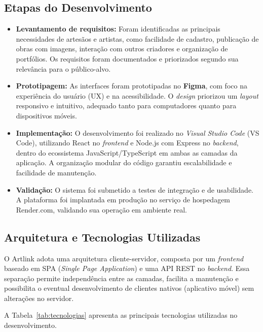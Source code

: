 \documentclass[a4paper, 12pt, oneside]{article}
\begin{document}
\subsection{Etapas do Desenvolvimento}

\begin{itemize}
    \item \textbf{Levantamento de requisitos:} Foram identificadas as principais necessidades de artesãos e artistas, como facilidade de cadastro, publicação de obras com imagens, interação com outros criadores e organização de portfólios. Os requisitos foram documentados e priorizados segundo sua relevância para o público-alvo.

    \item \textbf{Prototipagem:} As interfaces foram prototipadas no \textbf{Figma}, com foco na experiência do usuário (UX) e na acessibilidade. O \textit{design} priorizou um \textit{layout} responsivo e intuitivo, adequado tanto para computadores quanto para dispositivos móveis.

    \item \textbf{Implementação:} O desenvolvimento foi realizado no \textit{Visual Studio Code} (VS Code), utilizando React no \textit{frontend} e Node.js com Express no \textit{backend}, dentro do ecossistema JavaScript/TypeScript em ambas as camadas da aplicação. A organização modular do código garantiu escalabilidade e facilidade de manutenção.

    \item \textbf{Validação:} O sistema foi submetido a testes de integração e de usabilidade. A plataforma foi implantada em produção no serviço de hospedagem Render.com, validando sua operação em ambiente real.
\end{itemize}

\subsection{Arquitetura e Tecnologias Utilizadas}

O Artlink adota uma arquitetura cliente-servidor, composta por um \textit{frontend} baseado em SPA (\textit{Single Page Application}) e uma API REST no \textit{backend}. Essa separação permite independência entre as camadas, facilita a manutenção e possibilita o eventual desenvolvimento de clientes nativos (aplicativo móvel) sem alterações no servidor.

A Tabela~\ref{tab:tecnologias} apresenta as principais tecnologias utilizadas no desenvolvimento.
\end{document}
